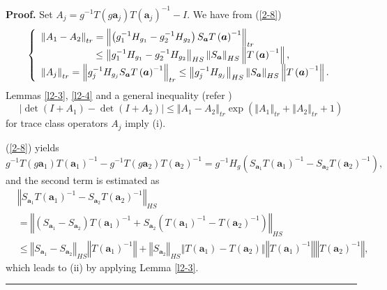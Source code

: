 \documentclass[a4paper]{article}%
\newenvironment{proof}[1][Proof]{\noindent\textbf{#1.} }{\ \rule{0.5em}{0.5em}}
\begin{document}
\begin{proof}
Set $A_{j}=g^{-1}T\left(  g\boldsymbol{a}_{j}\right)  T\left(  \boldsymbol{a}%
_{j}\right)  ^{-1}-I$. We have from (\ref{2-8})%
\[
\left\{
\begin{array}
[c]{l}%
\left\Vert A_{1}-A_{2}\right\Vert _{tr}=\left\Vert \left(  g_{1}^{-1}H_{g_{1}%
}-g_{2}^{-1}H_{g_{2}}\right)  S_{\boldsymbol{a}}T\left(  \boldsymbol{a}%
\right)  ^{-1}\right\Vert _{tr}\\
\text{ \ \ \ \ \ \ \ \ \ \ \ \ \ \ \ }\leq\left\Vert g_{1}^{-1}H_{g_{1}}%
-g_{2}^{-1}H_{g_{2}}\right\Vert _{HS}\left\Vert S_{\boldsymbol{a}}\right\Vert
_{HS}\left\Vert T\left(  \boldsymbol{a}\right)  ^{-1}\right\Vert \text{,}\\
\left\Vert A_{j}\right\Vert _{tr}=\left\Vert g_{j}^{-1}H_{g_{j}}%
S_{\boldsymbol{a}}T\left(  \boldsymbol{a}\right)  ^{-1}\right\Vert _{tr}%
\leq\left\Vert g_{j}^{-1}H_{g_{j}}\right\Vert _{HS}\left\Vert
S_{\boldsymbol{a}}\right\Vert _{HS}\left\Vert T\left(  \boldsymbol{a}\right)
^{-1}\right\Vert \text{.}%
\end{array}
\right.
\]
Lemmas \ref{l2-3}, \ref{l2-4} and a general inequality (refer \cite{si})%
\[
\left\vert \det\left(  I+A_{1}\right)  -\det\left(  I+A_{2}\right)
\right\vert \leq\left\Vert A_{1}-A_{2}\right\Vert _{tr}\exp\left(  \left\Vert
A_{1}\right\Vert _{tr}+\left\Vert A_{2}\right\Vert _{tr}+1\right)
\]
for trace class operators $A_{j}$ imply (i).

(\ref{2-8}) yields%
\[
g^{-1}T\left(  g\boldsymbol{a}_{1}\right)  T\left(  \boldsymbol{a}_{1}\right)
^{-1}-g^{-1}T\left(  g\boldsymbol{a}_{2}\right)  T\left(  \boldsymbol{a}%
_{2}\right)  ^{-1}=g^{-1}H_{g}\left(  S_{\boldsymbol{a}_{1}}T\left(
\boldsymbol{a}_{1}\right)  ^{-1}-S_{\boldsymbol{a}_{2}}T\left(  \boldsymbol{a}%
_{2}\right)  ^{-1}\right)  \text{,}%
\]
and the second term is estimated as%
\begin{align*}
&  \left\Vert S_{\boldsymbol{a}_{1}}T\left(  \boldsymbol{a}_{1}\right)
^{-1}-S_{\boldsymbol{a}_{2}}T\left(  \boldsymbol{a}_{2}\right)  ^{-1}%
\right\Vert _{HS}\\
&  =\left\Vert \left(  S_{\boldsymbol{a}_{1}}-S_{\boldsymbol{a}_{2}}\right)
T\left(  \boldsymbol{a}_{1}\right)  ^{-1}+S_{\boldsymbol{a}_{2}}\left(
T\left(  \boldsymbol{a}_{1}\right)  ^{-1}-T\left(  \boldsymbol{a}_{2}\right)
^{-1}\right)  \right\Vert _{HS}\\
&  \leq\left\Vert S_{\boldsymbol{a}_{1}}-S_{\boldsymbol{a}_{2}}\right\Vert
_{HS}\left\Vert T\left(  \boldsymbol{a}_{1}\right)  ^{-1}\right\Vert
+\left\Vert S_{\boldsymbol{a}_{2}}\right\Vert _{HS}\left\Vert T\left(
\boldsymbol{a}_{1}\right)  -T\left(  \boldsymbol{a}_{2}\right)  \right\Vert
\left\Vert T\left(  \boldsymbol{a}_{1}\right)  ^{-1}\right\Vert \left\Vert
T\left(  \boldsymbol{a}_{2}\right)  ^{-1}\right\Vert \text{,}%
\end{align*}
which leads to (ii) by applying Lemma \ref{l2-3}.\bigskip
\end{proof}
\end{document}
